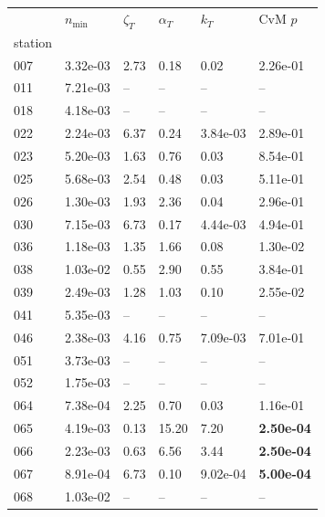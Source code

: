 \begin{figure}[htbp!]
    \centering
    {\footnotesize
    \begin{minipage}[t]{0.48\linewidth}
        \centering
        \begin{tabular}{llllll}
        \toprule
         & $n_{\min}$ & $\zeta_T$ & $\alpha_T$ & $k_T$ & CvM $p$ \\
        station &  &  &  &  &  \\
        \midrule
                    007 & 3.32e-03 & 2.73 & 0.18 & 0.02 & 2.26e-01\\
                    011 & 7.21e-03 & -- & -- & -- & --\\
                    018 & 4.18e-03 & -- & -- & -- & --\\
                    022 & 2.24e-03 & 6.37 & 0.24 & 3.84e-03 & 2.89e-01\\
                    023 & 5.20e-03 & 1.63 & 0.76 & 0.03 & 8.54e-01\\
                    025 & 5.68e-03 & 2.54 & 0.48 & 0.03 & 5.11e-01\\
                    026 & 1.30e-03 & 1.93 & 2.36 & 0.04 & 2.96e-01\\
                    030 & 7.15e-03 & 6.73 & 0.17 & 4.44e-03 & 4.94e-01\\
                    036 & 1.18e-03 & 1.35 & 1.66 & 0.08 & 1.30e-02\\
                    038 & 1.03e-02 & 0.55 & 2.90 & 0.55 & 3.84e-01\\
                    039 & 2.49e-03 & 1.28 & 1.03 & 0.10 & 2.55e-02\\
                    041 & 5.35e-03 & -- & -- & -- & --\\
                    046 & 2.38e-03 & 4.16 & 0.75 & 7.09e-03 & 7.01e-01\\
                    051 & 3.73e-03 & -- & -- & -- & --\\
                    052 & 1.75e-03 & -- & -- & -- & --\\
                    064 & 7.38e-04 & 2.25 & 0.70 & 0.03 & 1.16e-01\\
                    065 & 4.19e-03 & 0.13 & 15.20 & 7.20 & \textbf{2.50e-04}\\
                    066 & 2.23e-03 & 0.63 & 6.56 & 3.44 & \textbf{2.50e-04}\\
                    067 & 8.91e-04 & 6.73 & 0.10 & 9.02e-04 & \textbf{5.00e-04}\\
                    068 & 1.03e-02 & -- & -- & -- & --\\

\end{tabular}
\end{minipage}}
\end{figure}
